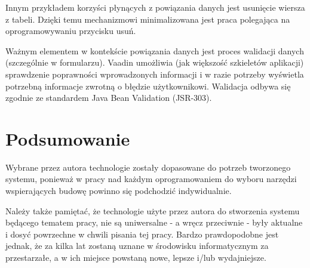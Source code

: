 Innym przykładem korzyści płynących z powiązania danych jest usunięcie wiersza z tabeli. Dzięki temu mechanizmowi minimalizowana jest praca polegająca na oprogramowywaniu przycisku usuń.

Ważnym elementem w kontekście powiązania danych jest proces walidacji danych (szczególnie w formularzu). Vaadin umożliwia (jak większość szkieletów aplikacji) sprawdzenie poprawności wprowadzonych informacji i w razie potrzeby wyświetla potrzebną informacje zwrotną o błędzie użytkownikowi. Walidacja odbywa się zgodnie ze standardem Java Bean Validation (JSR-303).
\newpage
\section{Podsumowanie}
Wybrane przez autora technologie zostały dopasowane do potrzeb tworzonego systemu, ponieważ w pracy nad każdym oprogramowaniem do wyboru narzędzi wspierających budowę powinno się podchodzić indywidualnie.

Należy także pamiętać, że technologie użyte przez autora do stworzenia systemu będącego tematem pracy, nie są uniwersalne - a wręcz przeciwnie - były aktualne i dosyć powrzechne w chwili pisania tej pracy. Bardzo prawdopodobne jest jednak, że za kilka lat zostaną uznane w środowisku informatycznym za przestarzałe, a w ich miejsce powstaną nowe, lepsze i/lub wydajniejsze.

